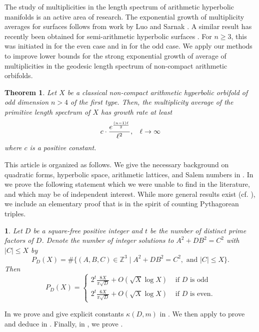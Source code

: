 \documentclass[12pt]{amsart}
\newcommand{\Z}{\mathbb{Z}}
\theoremstyle{plain}
\newtheorem{mainthm}{Theorem}
\begin{document}
The study of multiplicities in the length spectrum of arithmetic hyperbolic manifolds is an active area of research. The exponential growth of multiplicity averages for surfaces follows from work by Luo and Sarnak \cite{LS94}. A similar result has recently been obtained for semi-arithmetic hyperbolic surfaces \cite{BCDP26}. For $n\geq 3$, this was initiated in \cite{BLMT22} for the even case and in \cite{G24} for the odd case. We apply our methods to improve lower bounds for the strong exponential growth of average of multiplicities in the geodesic length spectrum of non-compact arithmetic orbifolds. 

\begin{mainthm} \label{ThmMeanMult}
Let $X$ be a classical non-compact arithmetic hyperbolic orbifold of odd dimension $n>4$ of the first type. Then, the multiplicity average of the primitive length spectrum of $X$ has growth rate at least 
\[ c\cdot\frac{e^{\frac{(n-1)\ell}{2}}}{\ell^2}, \hspace{3mm}\ell\to\infty \]
where $c$ is a positive constant.
\end{mainthm}

This article is organized as follows. We give the necessary background on quadratic forms, hyperbolic space, arithmetic lattices, and Salem numbers in . In  we prove the following statement which we were unable to find in the literature, and which may be of independent interest. While more general results exist (cf. \cite{efthymios}), we include an elementary proof that is in the spirit of counting Pythagorean triples.

\newtheorem*{laterthm}{}
\begin{laterthm}
    Let $D$ be a square-free positive integer and $t$ be the number of distinct prime factors of $D$. Denote the number of integer solutions to $A^2+DB^2=C^2$ with $|C|\leq X$ by
    \[ P_D(X)=\#\{(A,B,C)\in \Z^{3}\mid A^2+DB^2=C^2, \mbox{  and  } |C|\leq X\}.
    \]
    Then
    \[ P_D(X) = \begin{cases}
    2^{t}\frac{8X}{\pi\sqrt{D}} + O(\sqrt{X}\log X)   &\text{ if $D$ is odd}\\
    2^{t}\frac{6X}{\pi\sqrt{D}} + O(\sqrt{X}\log X)   &\text{ if $D$ is even} .
    \end{cases} \]
\end{laterthm}

In  we prove  and give explicit constants $\kappa(D,m)$ in . We then apply  to prove  and deduce  in . Finally, in , we prove .
\end{document}
